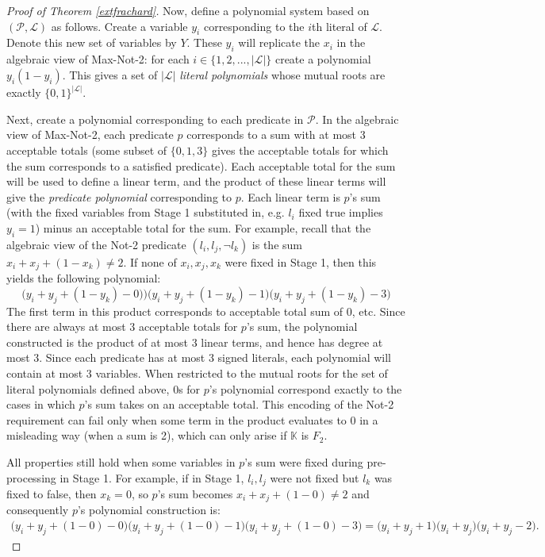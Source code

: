 \documentclass{article}
\begin{document}
\begin{proof}[Proof of Theorem \ref{extfrachard}]
Now, define a polynomial system based on $(\mathcal{P}, \mathcal{L})$ as follows. Create a variable $y_i$ corresponding to the $i$th literal of $\mathcal{L}$. Denote this new set of variables by $Y$. These $y_i$ will replicate the $x_i$ in the algebraic view of Max-Not-2: for each $i\in \{1,2,...,|\mathcal{L}|\}$ create a polynomial $y_i(1-y_i)$. This gives a set of $|\mathcal{L}|$ \emph{literal polynomials} whose mutual roots are exactly $\{0,1\}^{|\mathcal{L}|}$.


Next, create a polynomial corresponding to each predicate in $\mathcal{P}$. In the algebraic view of Max-Not-2, each predicate $p$ corresponds to a sum with at most 3 acceptable totals (some subset of $\{0,1,3\}$ gives the acceptable totals for which the sum corresponds to a satisfied predicate). 
Each acceptable total for the sum 
will be used to define a linear term, and the product of these linear terms will give the \emph{predicate polynomial} corresponding to $p$. Each linear term is $p$'s sum (with the fixed variables from Stage 1 substituted in, e.g. $l_i$ fixed true implies $y_i=1$) minus an acceptable total for the sum. For example, recall that the algebraic view of the Not-2 predicate $(l_i,l_j,\neg l_k)$ is the sum $x_i+x_j+(1-x_k)\neq 2$.
If none of $x_i, x_j, x_k$ were fixed in Stage 1, then this yields the following polynomial:
\[
\bigl(y_i+y_j+(1-y_k)-0\bigr))\bigl(y_i+y_j+(1-y_k)-1\bigr)\bigl(y_i+y_j+(1-y_k)-3\bigr)
\]
The first term in this product corresponds to acceptable total sum of 0, etc.
Since there are always at most 3 acceptable totals for $p$'s sum, the polynomial constructed is the product of at most 3 linear terms, and hence has degree at most 3. Since each predicate has at most 3 signed literals, each polynomial will contain at most 3 variables. When restricted to the mutual roots for the set of literal polynomials defined above, 0s for $p$'s polynomial correspond exactly to the cases in which $p$'s sum takes on an acceptable total. This encoding of the Not-2 requirement can fail only when some term in the product evaluates to 0 in a misleading way (when a sum is 2), which can only arise if $\mathbb{K}$ is $F_2$.

All properties still hold when some variables in $p$'s sum were fixed during pre-processing in Stage 1. For example, if in Stage 1, $l_i, l_j$ were not fixed but $l_k$ was fixed to false, then $x_k=0$, so $p$'s sum becomes $x_i+x_j+(1-0)\neq 2$ and consequently $p$'s polynomial construction is:
\begin{align*}
\bigl(y_i+y_j+(1-0)-0\bigr)\bigl(y_i+y_j+(1-0)-1\bigr)\bigl(y_i+y_j+(1-0)-3\bigr)=
\bigl(y_i+y_j+1\bigr)\bigl(y_i+y_j\bigr)\bigl(y_i+y_j-2\bigr).
\end{align*}


\end{proof}
\end{document}
